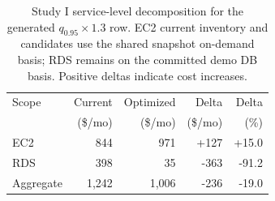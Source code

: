 \begin{table}[t]
\caption{Study I service-level decomposition for the generated $q_{0.95}\times1.3$ row. EC2 current inventory and candidates use the shared snapshot on-demand basis; RDS remains on the committed demo DB basis. Positive deltas indicate cost increases.}
\label{tab:service-decomp}
\centering
\renewcommand{\arraystretch}{1.06}
\begin{tabular}{@{}l r r r r@{}}
\toprule
Scope & Current & Optimized & Delta & Delta \\
 & (\$/mo) & (\$/mo) & (\$/mo) & (\%) \\
\midrule
EC2 & 844 & 971 & +127 & +15.0 \\
RDS & 398 & 35 & -363 & -91.2 \\
Aggregate & 1,242 & 1,006 & -236 & -19.0 \\
\bottomrule
\end{tabular}
\end{table}
